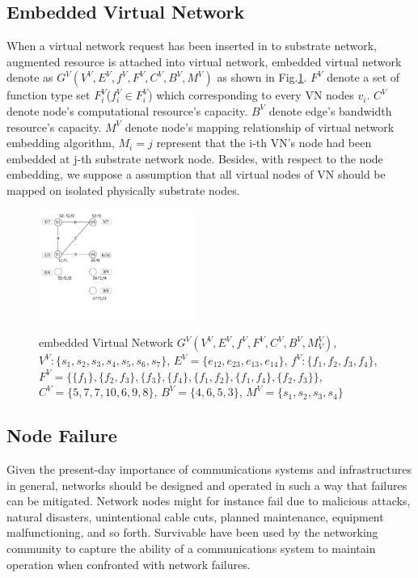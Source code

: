 \subsection{Embedded Virtual Network}
\label{sec:embeddedVirtualNetwork}
When a virtual network request has been inserted in to substrate network, augmented resource is attached into virtual network, embedded virtual network denote as $G^V (V^V,E^V,f^V,F^V,C^V,B^V,M^V)$ as shown in Fig.\ref{fig:eVN}. $F^V$ denote a set of function type set $F^V_i$($f^V_i\in F^V_i$) which corresponding to every VN nodes $v_i$. $C^V$ denote node's computational resource's capacity. $B^V$ denote edge's bandwidth resource's capacity. $M^V$ denote node's mapping relationship of virtual network embedding algorithm, $M_{i}=j$ represent that the i-th VN's node had been embedded at j-th substrate network node. Besides, with respect to the node embedding, we suppose a assumption that all virtual nodes of VN should be mapped on isolated physically substrate nodes.
\begin{figure}
\centering
\includegraphics[width=2in]{Fig/eVN}\\
\caption{embedded Virtual Network $G^V (V^V,E^V,f^V,F^V,C^V,B^V,M^V_V)$, $V^V:\{s_1,s_2,s_3,s_4,s_5,s_6,s_7\}$, $E^V=\{e_{12},e_{23},e_{13},e_{14}\}$, $f^V:\{f_1,f_2,f_3,f_4\}$,
$F^V=\{\{f_1\},\{f_2,f_3\},\{f_3\},\{f_4\},\{f_1,f_2\},\{f_1,f_4\},\{f_2,f_3\}\}$, $C^V=\{5,7,7,10,6,9,8\}$, $B^V=\{4,6,5,3\}$, $M^V=\{s_1,s_2,s_3,s_4\}$}\label{fig:eVN}
\end{figure}


\subsection{Node Failure}
Given the present-day importance of communications systems and infrastructures in general, networks should be designed and operated in such a way that failures can be mitigated. Network nodes  might for instance fail due to malicious attacks, natural disasters, unintentional cable cuts, planned maintenance, equipment malfunctioning, and so forth. Survivable have been used by the networking community to capture the ability of a communications system to maintain operation when confronted
with network failures.

